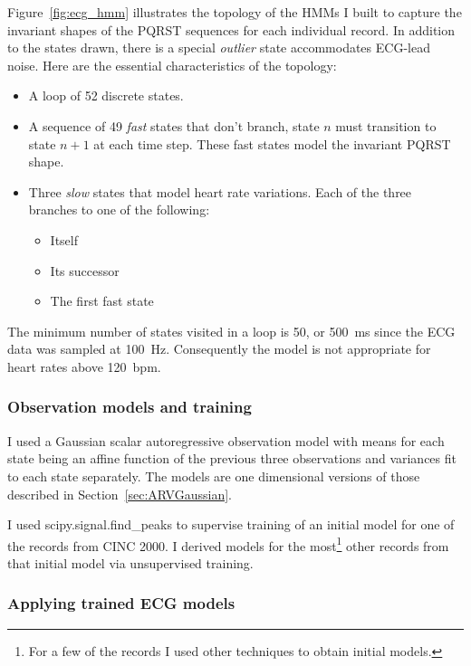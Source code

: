 Figure~\ref{fig:ecg_hmm} illustrates the topology of the HMMs I built
to capture the invariant shapes of the PQRST sequences for each
individual record.  In addition to the states drawn, there is a
special \emph{outlier} state accommodates ECG-lead noise.  Here are
the essential characteristics of the topology:
\begin{itemize}
\item A loop of 52 discrete states.
\item A sequence of 49 \emph{fast} states that don't branch, state $n$ must
  transition to state $n+1$ at each time step.  These fast states
  model the invariant PQRST shape.
\item Three \emph{slow} states that model heart rate variations.
  Each of the three branches to one of the following:
  \begin{itemize}
  \item Itself
  \item Its successor
  \item The first fast state
  \end{itemize}
\end{itemize}
The minimum number of states visited in a loop is 50, or 500~ms since
the ECG data was sampled at 100~Hz.  Consequently the model is not
appropriate for heart rates above 120~bpm.

\subsubsection{Observation models and training}
\label{sec:ecg_training}

I used a Gaussian scalar autoregressive observation model with means
for each state being an affine function of the previous three
observations and variances fit to each state separately.  The models
are one dimensional versions of those described in
Section~\ref{sec:ARVGaussian}.

I used scipy.signal.find\_peaks to supervise training of an initial
model for one of the records from CINC 2000.  I derived models for the
most\footnote{For a few of the records I used other techniques to
  obtain initial models.} other records from that initial model via
unsupervised training.

\subsubsection{Applying trained ECG models}
\label{sec:applying_ECG_models}

